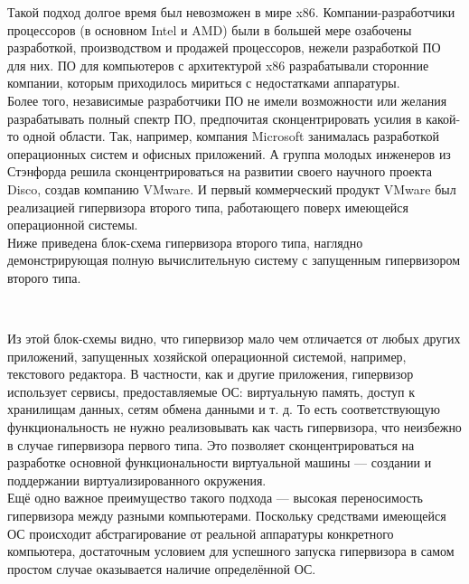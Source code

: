 \documentclass[14pt, a4paper]{article}
\begin{document}
Такой подход долгое время был невозможен в мире x86. Компании-разработчики процессоров (в
основном Intel и AMD) были в большей мере озабочены разработкой, производством и продажей
процессоров, нежели разработкой ПО для них. ПО для компьютеров с архитектурой x86
разрабатывали сторонние компании, которым приходилось мириться с недостатками аппаратуры.\\

Более того, независимые разработчики ПО не имели возможности или желания разрабатывать
полный спектр ПО, предпочитая сконцентрировать усилия в какой-то одной области. Так, например,
компания Microsoft занималась разработкой операционных систем и офисных приложений. А группа
молодых инженеров из Стэнфорда решила сконцентрироваться на развитии своего научного проекта
Disco, создав компанию VMware. И первый коммерческий продукт VMware был реализацией
гипервизора второго типа, работающего поверх имеющейся операционной системы.\\

Ниже приведена блок-схема гипервизора второго типа, наглядно демонстрирующая полную
вычислительную систему с запущенным гипервизором второго типа.

\begin{figure}[h]
    \centering
    \\
    \label{framework} 
\end{figure}

Из этой блок-схемы видно, что гипервизор мало чем отличается от любых других приложений,
запущенных хозяйской операционной системой, например, текстового редактора. В частности, как и
другие приложения, гипервизор использует сервисы, предоставляемые ОС: виртуальную память,
доступ к хранилищам данных, сетям обмена данными и т. д. То есть соответствующую
функциональность не нужно реализовывать как часть гипервизора, что неизбежно в случае
гипервизора первого типа. Это позволяет сконцентрироваться на разработке основной
функциональности виртуальной машины — создании и поддержании виртуализированного окружения.\\

Ещё одно важное преимущество такого подхода — высокая переносимость гипервизора между
разными компьютерами. Поскольку средствами имеющейся ОС происходит абстрагирование от
реальной аппаратуры конкретного компьютера, достаточным условием для успешного запуска
гипервизора в самом простом случае оказывается наличие определённой ОС.\\
\end{document}

